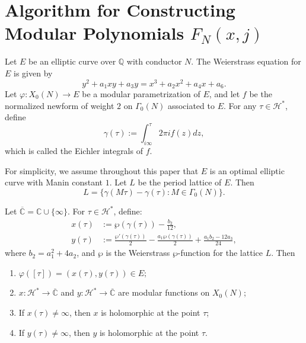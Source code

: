 \documentclass[10pt, a4paper]{article}
\begin{document}
\section{Algorithm for Constructing Modular Polynomials $F_N(x,j)$}

Let $E$ be an elliptic curve over $\mathbb{Q}$ with conductor $N$. The Weierstrass equation for $E$ is given by
\begin{equation}
y^2 + a_1xy + a_3y = x^3 + a_2x^2 + a_4x + a_6.
\end{equation}
Let $\varphi: X_0(N) \to E$ be a modular parametrization of $E$, and let $f$ be the  normalized newform of weight $2$ on  $\Gamma_0(N)$ associated to $E$.
For any $\tau \in \mathcal{H}^*$,  define
\begin{equation}
\gamma (\tau) := \int_{{i\infty }}^{\tau} 2\pi i f(z) dz,
\end{equation}
which is called the Eichler integrals of $f$.

For simplicity, we assume throughout this paper that $E$ is an optimal elliptic curve with Manin constant $1$.  Let $L$ be the period lattice of $E$.  Then
\[
L = \{\gamma(M\tau) - \gamma(\tau) : M \in \Gamma_0(N)\}.
\]

Let $\overline{\mathbb{C}} = \mathbb{C} \cup \{\infty\}$. For $\tau \in \mathcal{H}^*$, define:
\begin{align}
x(\tau) &:= \wp(\gamma(\tau)) - \frac{b_2}{12},\\
y(\tau)& := \frac{\wp'(\gamma(\tau))}{2} - \frac{a_1\wp(\gamma(\tau))}{2} + \frac{a_1b_2 - 12a_3}{24},
\end{align}
where $b_2 = a_1^2 + 4a_2$, and $\wp$ is the Weierstrass $\wp$-function for the lattice $L$.  Then

\begin{enumerate}
   \item [(i)]$ \varphi ([\tau ]) =(x(\tau), y(\tau)) \in E;$
    \item[(ii)] \( x: \mathcal{H}^* \to \overline{\mathbb{C}} \) and \( y: \mathcal{H}^* \to \overline{\mathbb{C}} \) are modular functions on \( X_0(N) \);

    \item[(iii)] If \( x(\tau) \neq \infty \), then \( x \) is holomorphic at the point \( \tau \);

    \item[(iv)] If \( y(\tau) \neq \infty \), then \( y \) is holomorphic at the point \( \tau \).
\end{enumerate}
\end{document}
